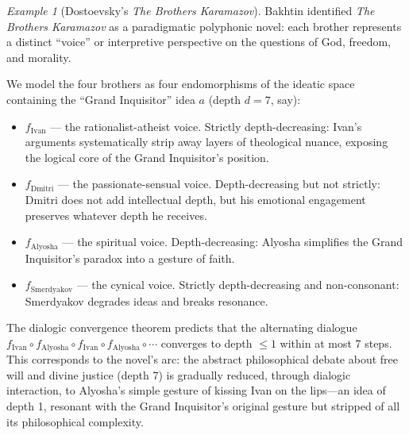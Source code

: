 \documentclass[11pt,openany]{book}
\theoremstyle{definition}
\theoremstyle{plain}
\theoremstyle{remark}
\newtheorem{example}[axiom]{Example}
\begin{document}
\begin{example}[Dostoevsky's \emph{The Brothers Karamazov}]
Bakhtin identified \emph{The Brothers Karamazov} as a paradigmatic polyphonic novel: each brother represents a distinct ``voice'' or interpretive perspective on the questions of God, freedom, and morality.

We model the four brothers as four endomorphisms of the ideatic space containing the ``Grand Inquisitor'' idea $a$ (depth $d = 7$, say):
\begin{itemize}
\item $f_{\text{Ivan}}$ --- the rationalist-atheist voice. Strictly depth-decreasing: Ivan's arguments systematically strip away layers of theological nuance, exposing the logical core of the Grand Inquisitor's position.
\item $f_{\text{Dmitri}}$ --- the passionate-sensual voice. Depth-decreasing but not strictly: Dmitri does not add intellectual depth, but his emotional engagement preserves whatever depth he receives.
\item $f_{\text{Alyosha}}$ --- the spiritual voice. Depth-decreasing: Alyosha simplifies the Grand Inquisitor's paradox into a gesture of faith.
\item $f_{\text{Smerdyakov}}$ --- the cynical voice. Strictly depth-decreasing and non-consonant: Smerdyakov degrades ideas and breaks resonance.
\end{itemize}

The dialogic convergence theorem predicts that the alternating dialogue $f_{\text{Ivan}} \circ f_{\text{Alyosha}} \circ f_{\text{Ivan}} \circ f_{\text{Alyosha}} \circ \cdots$ converges to depth $\leq 1$ within at most 7 steps. This corresponds to the novel's arc: the abstract philosophical debate about free will and divine justice (depth 7) is gradually reduced, through dialogic interaction, to Alyosha's simple gesture of kissing Ivan on the lips---an idea of depth 1, resonant with the Grand Inquisitor's original gesture but stripped of all its philosophical complexity.
\end{example}
\end{document}
